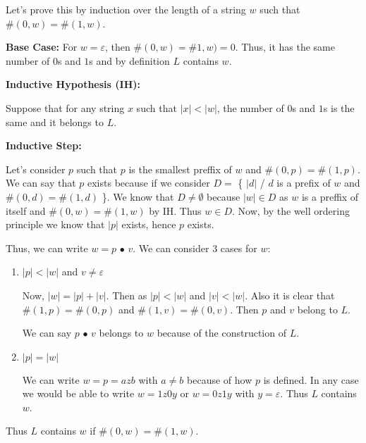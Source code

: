 \documentclass[12pt]{article}
\begin{document}
Let's prove this by induction over the length of a string $w$ such that $\#(0,w)=\#(1,w)$.

\textbf{Base Case:}
For $w = \varepsilon$, then $\#(0,w)=\#1,w)=0$. Thus, it has the same number of $0$s and $1$s and by definition $L$ contains $w$.

\textbf{Inductive Hypothesis (IH):}

Suppose that for any string $x$ such that $|x|<|w|$, the number of $0$s and $1$s is the same and it belongs to $L$.

\textbf{Inductive Step:}

Let's consider $p$ such that $p$ is the smallest preffix of $w$ and $\#(0,p)=\#(1,p)$. We can say that $p$ exists because if we consider $D =$ \{ $|d|$ / $d$ is a prefix of $w$ and $\#(0,d)=\#(1,d)$ \}. We know that $D \neq \emptyset$ because $|w| \in D$ as $w$ is a preffix of itself and $\#(0,w)=\#(1,w)$ by IH. Thus $w \in D$. Now, by the well ordering principle we know that $|p|$ exists, hence $p$ exists.

Thus, we can write $w=p\text{ • }v$. We can consider 3 cases for $w$:
\begin{enumerate}
    \item $|p|<|w|$ and $v\neq\varepsilon$

        Now, $|w|=|p|+|v|$. Then as $|p|<|w|$ and $|v|<|w|$. Also it is clear that $\#(1,p)=\#(0,p)$ and $\#(1,v)=\#(0,v)$. Then $p$ and $v$ belong to $L$.

        We can say $p \text{ • } v$ belongs to $w$ because of the construction of $L$.

    \item $|p|=|w|$

        We can write $w=p=azb$ with $a \neq b$ because of how $p$ is defined. In any case we would be able to write $w=1z0y$ or $w=0z1y$ with $y=\varepsilon$. Thus $L$ contains $w$.
\end{enumerate}

Thus $L$ contains $w$ if $\#(0,w)=\#(1,w)$.
\end{document}
